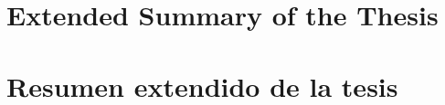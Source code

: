 \documentclass[spanish,openright]{book}
\begin{document}
%

\mainmatter                                       %

  {\part{Extended Summary of the Thesis}}         %
  {\part{Resumen extendido de la tesis}}          %
\label{part:compendium-summary}                   %










%
\end{document}
